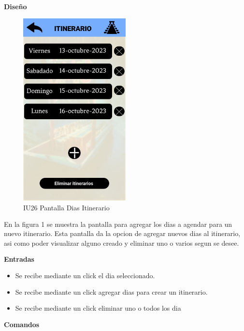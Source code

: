 \textbf{Diseño}\\
\begin{figure}[h]
    \centering 
    \includegraphics[width=0.5\textwidth]{Pantallas Prototipo3/IU26 Pantalla Dias Itinerario.jpg} 
    \caption{IU26 Pantalla Dias Itinerario} %
    \label{fig:Pantalla de itinerarios} %
\end{figure}

En la figura 1 se muestra la pantalla para agregar los dias a agendar para un nuevo itinerario. Esta pantalla da la opcion de agregar nuevos dias al itinerario, asi como poder visualizar alguno creado y eliminar uno o varios segun se desee.

\textbf{Entradas}\\
\begin{itemize}
    \item Se recibe mediante un click el dia seleccionado.

     \item Se recibe mediante un click agregar dias para crear un itinerario.\\
 \item Se recibe mediante un click eliminar uno o todos los dia \\
\end{itemize}

\textbf{Comandos}\\

